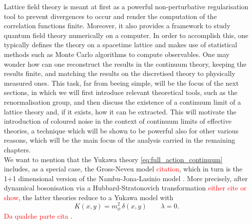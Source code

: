 {Lattice field theory \cite{Montvay1994QuantumLattice,rothe_LGT,gattringer_LQCD,creutz_2023} is meant at first as a powerful non-perturbative regularisation tool to prevent divergences to occur and render the computation of the correlation functions finite. Moreover, it also provides a framework to study quantum field theory numerically on a computer. In order to accomplish this, one typically defines the theory on a spacetime lattice and makes use of statistical methods such as Monte Carlo algorithms to compute observables. One may wonder how can one reconstruct the results in the continuum theory, keeping the results finite, and matching the results on the discretised theory to physically measured ones. This task, far from beeing simple, will be the focus of the next sections, in which we will first introduce relevant theoretical tools, such as the renormalisation group, and then discuss the existence of a continuum limit of a lattice theory and, if it exists, how it can be extracted. This will motivate the introduction of coloured noise in the context of continuum limits of effective theories, a technique which will be shown to be powerful also for other various reasons, which will be the main focus of the analysis carried in the remaining chapters. \\
We want to mention that the Yukawa theory \eqref{eq:full_action_continuum} includes, as a special case, the Gross-Neveu model \textcolor{red}{citation}, which in turn is the 1+1 dimensional version of the Nambu-Jona-Lasinio model \cite{Nambu1961DynamicalI, Nambu1961DynamicalII}.
More precisely, after dynamical bosonisation via a Hubbard-Stratonovich transformation \textcolor{red}{either cite or show}, the latter theories reduce to a Yukawa model with 
\begin{equation*}
    K(x,y) = m_\phi^2 \, \delta(x,y) \qquad \lambda = 0.
\end{equation*}
\textcolor{red}{Da qualche parte cita \cite{carosso2020novel}}.}